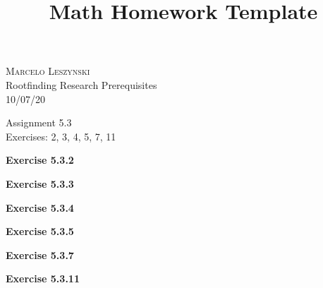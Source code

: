 \documentclass[12pt,oneside]{article}
\newenvironment{exercise}[1]{\vspace{.1in}\noindent\textbf{Exercise #1 \hspace{.05em}}}{}
\begin{document}
\title{Math Homework Template}

\begin{flushright}
\textsc{Marcelo Leszynski}  \\
Rootfinding Research Prerequisites\\
10/07/20
\end{flushright}

\begin{center}
\textsf{Assignment 5.3 } \\
\textsf{Exercises: 2, 3, 4, 5, 7, 11 }
\end{center}


\begin{exercise}{5.3.2}

\end{exercise}


\begin{exercise}{5.3.3}

\end{exercise}


\begin{exercise}{5.3.4}

\end{exercise}


\begin{exercise}{5.3.5}

\end{exercise}


\begin{exercise}{5.3.7}

\end{exercise}


\begin{exercise}{5.3.11}

\end{exercise}


\end{document}
